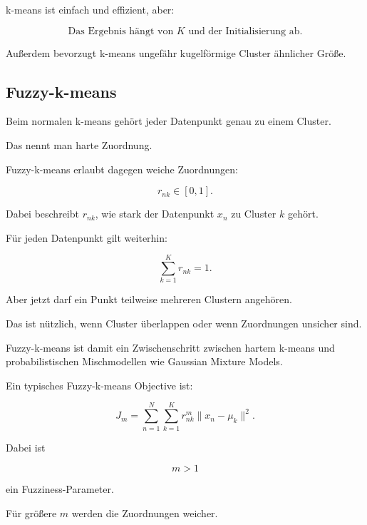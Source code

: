 \documentclass[11pt,a4paper]{scrartcl}
\begin{document}
\begin{answerbox}
    k-means ist einfach und effizient, aber:

    \[
        \boxed{
            \text{Das Ergebnis hängt von } K \text{ und der Initialisierung ab.}
        }
    \]

    Außerdem bevorzugt k-means ungefähr kugelförmige Cluster ähnlicher Größe.
\end{answerbox}

\subsection{Fuzzy-k-means}

\begin{notebox}
    Beim normalen k-means gehört jeder Datenpunkt genau zu einem Cluster.

    Das nennt man harte Zuordnung.

    Fuzzy-k-means erlaubt dagegen weiche Zuordnungen:

    \[
        r_{nk} \in [0,1].
    \]

    Dabei beschreibt \(r_{nk}\), wie stark der Datenpunkt \(x_n\) zu Cluster
    \(k\) gehört.
\end{notebox}

\begin{solutionbox}
    Für jeden Datenpunkt gilt weiterhin:

    \[
        \sum_{k=1}^{K} r_{nk}=1.
    \]

    Aber jetzt darf ein Punkt teilweise mehreren Clustern angehören.

    Das ist nützlich, wenn Cluster überlappen oder wenn Zuordnungen unsicher
    sind.

    Fuzzy-k-means ist damit ein Zwischenschritt zwischen hartem k-means und
    probabilistischen Mischmodellen wie Gaussian Mixture Models.
\end{solutionbox}

\begin{calculationbox}
    Ein typisches Fuzzy-k-means Objective ist:

    \[
        J_m
        =
        \sum_{n=1}^{N}
        \sum_{k=1}^{K}
        r_{nk}^{m}
        \|x_n-\mu_k\|^2.
    \]

    Dabei ist

    \[
        m>1
    \]

    ein Fuzziness-Parameter.

    Für größere \(m\) werden die Zuordnungen weicher.
\end{calculationbox}
\end{document}
